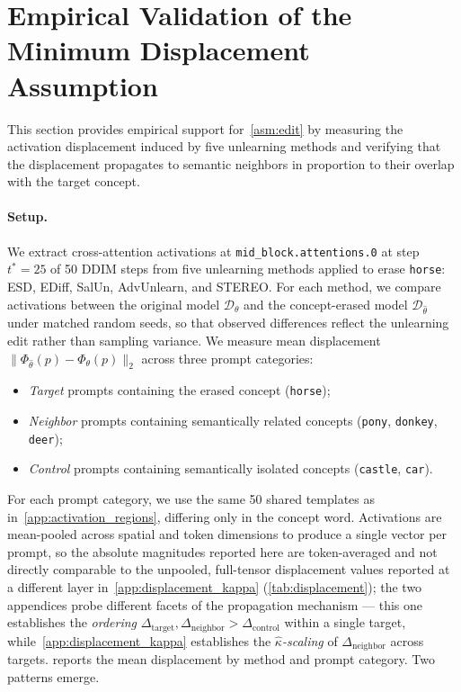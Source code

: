 \section{Empirical Validation of the Minimum Displacement Assumption}
\label{app:displacement}

This section provides empirical support for~\cref{asm:edit} by measuring the activation displacement induced by five unlearning methods and verifying that the displacement propagates to semantic neighbors in proportion to their overlap with the target concept.

\paragraph{Setup.}
We extract cross-attention activations at \texttt{mid\_block.attentions.0} at step $t^*{=}25$ of 50 DDIM steps from five unlearning methods applied to erase \texttt{horse}: ESD, EDiff, SalUn, AdvUnlearn, and STEREO. For each method, we compare activations between the original model $\mathcal{D}_\theta$ and the concept-erased model $\mathcal{D}_{\hat\theta}$ under matched random seeds, so that observed differences reflect the unlearning edit rather than sampling variance. We measure mean displacement $\|\Phi_{\hat\theta}(p) - \Phi_\theta(p)\|_2$ across three prompt categories:
\begin{itemize}
    \item \emph{Target} prompts containing the erased concept (\texttt{horse});
    \item \emph{Neighbor} prompts containing semantically related concepts (\texttt{pony}, \texttt{donkey}, \texttt{deer});
    \item \emph{Control} prompts containing semantically isolated concepts (\texttt{castle}, \texttt{car}).
\end{itemize}
For each prompt category, we use the same 50 shared templates as in~\cref{app:activation_regions}, differing only in the concept word. Activations are mean-pooled across spatial and token dimensions to produce a single vector per prompt, so the absolute magnitudes reported here are token-averaged and not directly comparable to the unpooled, full-tensor displacement values reported at a different layer in~\cref{app:displacement_kappa} (\cref{tab:displacement}); the two appendices probe different facets of the propagation mechanism --- this one establishes the \emph{ordering} $\Delta_{\mathrm{target}}, \Delta_{\mathrm{neighbor}} > \Delta_{\mathrm{control}}$ within a single target, while~\cref{app:displacement_kappa} establishes the \emph{$\hat\kappa$-scaling} of $\Delta_{\mathrm{neighbor}}$ across targets.  reports the mean displacement by method and prompt category. Two patterns emerge.

